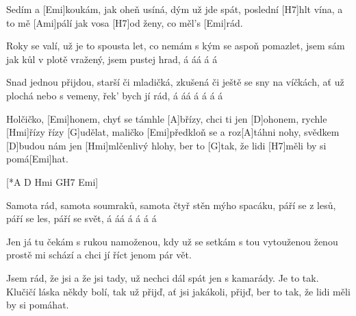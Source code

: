 
\sloka
Sedím a [Emi]koukám, jak oheň usíná,
dým už jde spát, poslední [H7]hlt vína,
a to mě [Ami]pálí jak vosa [H7]od ženy,
co měl’s [Emi]rád.

\sloka
Roky se valí, už je to spousta let,
co nemám s kým se aspoň pomazlet,
jsem sám jak kůl v plotě vražený,
jsem pustej hrad, á áá á á

\sloka
Snad jednou přijdou, starší či mladičká,
zkušená či ještě se sny na víčkách,
ať už plochá nebo s vemeny,
řek’ bych jí rád, á áá á á á á

\hvezda
Holčičko, [Emi]honem, chyť se támhle [A]břízy,
chci ti jen [D]ohonem, rychle [Hmi]řízy řízy [G\dim]udělat,
maličko [Emi]předkloň se a roz[A]táhni nohy,
svědkem [D]budou nám jen [Hmi]mlčenlivý hlohy,
ber to [G\dim]tak, že lidi [H7]měli by si pomá[Emi]hat.

[*A D Hmi G\dim H7 Emi]

\sloka
Samota rád, samota soumraků,
samota čtyř stěn mýho spacáku,
páří se z lesů, páří se les,
páří se svět, á áá á á á á

\sloka
Jen já tu čekám s rukou namoženou,
kdy už se setkám s tou vytouženou ženou
prostě mi schází a chci jí říct
jenom pár vět.

\hvezda
Jsem rád, že jsi a že jsi tady,
už nechci dál spát jen s kamarády.
Je to tak.
Klučičí láska někdy bolí,
tak už přijď, ať jsi jakákoli,
přijď, ber to tak, že lidi měli by si pomáhat.
